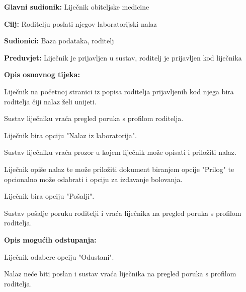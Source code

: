 					\noindent {}
					\begin{packed_item}
						
						\item \textbf{Glavni sudionik: }Liječnik obiteljske medicine
						\item  \textbf{Cilj:} Roditelju poslati njegov laboratorijski nalaz 
						\item  \textbf{Sudionici:} Baza podataka, roditelj
						\item  \textbf{Preduvjet:} Liječnik je prijavljen u sustav, roditelj je prijavljen kod liječnika
						\item  \textbf{Opis osnovnog tijeka:}
						
						\item[] \begin{packed_enum}
							
							\item Liječnik na početnoj stranici iz popisa roditelja prijavljenih kod njega bira roditelja čiji nalaz želi unijeti.
							\item Sustav liječniku vraća pregled poruka s profilom roditelja.
							\item Liječnik bira opciju "Nalaz iz laboratorija".
							\item Sustav liječniku vraća prozor u kojem liječnik može opisati i priložiti nalaz.
							\item Liječnik opiše nalaz te može priložiti dokument biranjem opcije "Prilog" te opcionalno može odabrati i opciju za izdavanje bolovanja.
							\item Liječnik bira opciju "Pošalji".
							\item Sustav pošalje poruku roditelji i vraća liječnika na pregled poruka s profilom roditelja.
						\end{packed_enum}
						
						\item  \textbf{Opis mogućih odstupanja:}
						
						\item[] \begin{packed_item}
							
							\item[6.a] Liječnik odabere opciju "Odustani".
							\item[] \begin{packed_enum}
								
								\item Nalaz neće biti poslan i sustav vraća liječnika na pregled poruka s profilom roditelja.
							\end{packed_enum}
							
							
						\end{packed_item}
						
						
					\end{packed_item}
					
